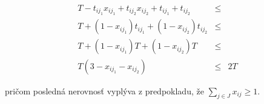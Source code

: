 \begin{dokaz}
  \begin{eqnarray*}
    T-t_{ij_1}x_{ij_1}+t_{ij_2}x_{ij_2}+t_{ij_1}+t_{ij_2} &\le \\
    T + (1-x_{ij_1})t_{ij_1} + (1-x_{ij_2})t_{ij_2} &\le \\
    T + (1-x_{ij_1})T + (1-x_{ij_2})T &\le \\
    T (3-x_{ij_1}-x_{ij_2})&\le& 2T
  \end{eqnarray*}
  
  \noindent
  pričom posledná nerovnosť vyplýva z predpokladu, že $\sum_{j\in J}x_{ij}\ge1$.

\end{dokaz}

